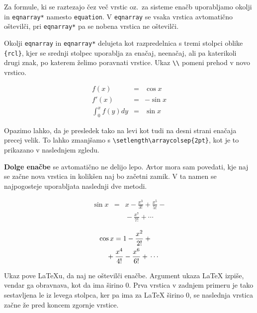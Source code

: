 Za formule, ki se raztezajo čez več vrstic oz.~za sisteme enačb
uporabljamo okolji  in \verb|eqnarray*| namesto
\texttt{equation}. V \texttt{eqnarray} se vsaka vrstica avtomatično oštevilči, pri 
\verb|eqnarray*| pa se nobena vrstica ne oštevilči.


Okolji \texttt{eqnarray} in \verb|eqnarray*| delujeta kot 
razpredelnica s tremi stolpci oblike \verb|{rcl}|, kjer se srednji stolpec
uporablja za enačaj,  neenačaj, ali pa katerikoli drugi znak, po katerem želimo poravnati vrstice.
Ukaz \verb|\\| pomeni prehod v novo vrstico.
\begin{example}
\begin{eqnarray}
f(x) & = & \cos x     \\
f'(x) & = & -\sin x   \\
\int_{0}^{x} f(y)dy &
 = & \sin x
\end{eqnarray}
\end{example}
Opazimo lahko, da je presledek tako na levi kot tudi na desni strani 
enačaja precej velik. To lahko zmanjšamo s
\verb|\setlength\arraycolsep{2pt}|, kot je to prikazano v naslednjem zgledu.


 \textbf{Dolge enačbe} se avtomatično ne delijo lepo. Avtor mora sam povedati, kje 
naj se začne nova vrstica in kolikšen naj bo začetni zamik. V ta namen
se najpogosteje
uporabljata naslednji dve metodi.
\begin{example}
{\setlength\arraycolsep{2pt}
\begin{eqnarray}
\sin x & = & x -\frac{x^{3}}{3!}
     +\frac{x^{5}}{5!}-{}
                    \nonumber\\
 & & {}-\frac{x^{7}}{7!}+{}\cdots
\end{eqnarray}}
\end{example}
\begin{example}
\begin{eqnarray}
\lefteqn{ \cos x = 1
     -\frac{x^{2}}{2!} +{} }
                    \nonumber\\
 & & {}+\frac{x^{4}}{4!}
     -\frac{x^{6}}{6!}+{}\cdots
\end{eqnarray}
\end{example}

\noindent Ukaz  pove \LaTeX{}u, da naj ne oštevilči enačbe. Argument ukaza 
 \LaTeX{} izpiše, vendar ga obravnava, kot da ima širino 0. Prva vrstica v zadnjem primeru je 
tako sestavljena le iz levega stolpca, ker pa ima za \LaTeX{} širino 0, se naslednja vrstica začne že pred koncem
zgornje vrstice.

